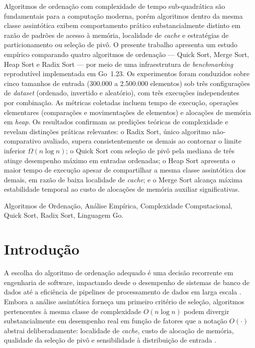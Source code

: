 \documentclass[12pt]{article}
\begin{document}
\begin{resumo}
Algoritmos de ordenação com complexidade de tempo sub-quadrática
são fundamentais para a computação moderna, porém algoritmos dentro
da mesma classe assintótica exibem comportamento prático substancialmente
distinto em razão de padrões de acesso à memória, localidade de
\textit{cache} e estratégias de particionamento ou seleção de pivô.
O presente trabalho apresenta um estudo empírico comparando quatro
algoritmos de ordenação --- Quick Sort, Merge Sort, Heap Sort e
Radix Sort --- por meio de uma infraestrutura de \textit{benchmarking}
reprodutível implementada em Go~1.23. Os experimentos foram conduzidos
sobre cinco tamanhos de entrada (300.000 a 2.500.000 elementos) sob
três configurações de \textit{dataset} (ordenado, invertido e aleatório),
com três execuções independentes por combinação. As métricas coletadas
incluem tempo de execução, operações elementares (comparações e
movimentações de elementos) e alocações de memória em \textit{heap}.
Os resultados confirmam as predições teóricas de complexidade e revelam
distinções práticas relevantes: o Radix Sort, único algoritmo
não-comparativo avaliado, supera consistentemente os demais ao
contornar o limite inferior $\Omega(n \log n)$; o Quick Sort com
seleção de pivô pela mediana de três atinge desempenho máximo em
entradas ordenadas; o Heap Sort apresenta o maior tempo de execução
apesar de compartilhar a mesma classe assintótica dos demais, em
razão de baixa localidade de \textit{cache}; e o Merge Sort alcança
máxima estabilidade temporal ao custo de alocações de memória auxiliar
significativas.

 Algoritmos de Ordenação, Análise Empírica,
Complexidade Computacional, Quick Sort, Radix Sort, Linguagem Go.
\end{resumo}

\section{Introdução}

A escolha do algoritmo de ordenação adequado é uma decisão recorrente
em engenharia de software, impactando desde o desempenho de sistemas de
banco de dados até a eficiência de pipelines de processamento de dados
em larga escala \cite{cormen2009}. Embora a análise assintótica forneça
um primeiro critério de seleção, algoritmos pertencentes à mesma classe
de complexidade $O(n \log n)$ podem divergir substancialmente em
desempenho real em função de fatores que a notação $O(\cdot)$ abstrai
deliberadamente: localidade de \textit{cache}, custo de alocação de
memória, qualidade da seleção de pivô e sensibilidade à distribuição
de entrada \cite{knuth1998}.
\end{document}
